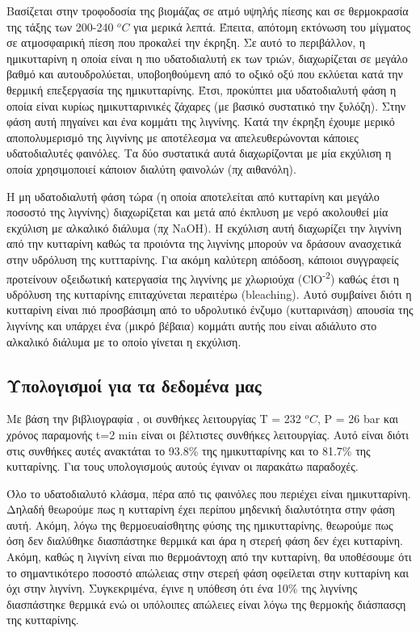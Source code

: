 \documentclass[11pt]{article}
\begin{document}
Βασίζεται στην τροφοδοσία της βιομάζας σε ατμό υψηλής πίεσης και σε θερμοκρασία της τάξης των 200-240 \(^oC\) για μερικά λεπτά. Έπειτα, απότομη εκτόνωση του μίγματος σε ατμοσφαιρική πίεση που προκαλεί την έκρηξη. Σε αυτό το περιβάλλον, η ημικυτταρίνη η οποία είναι η πιο υδατοδιαλυτή εκ των τριών, διαχωρίζεται σε μεγάλο βαθμό και αυτουδρολύεται, υποβοηθούμενη από το οξικό οξύ που εκλύεται κατά την θερμική επεξεργασία της ημικυτταρίνης. Έτσι, προκύπτει μια υδατοδιαλυτή φάση η οποία είναι κυρίως ημικυτταρινικές ζάχαρες (με βασικό συστατικό την ξυλόζη). Στην φάση αυτή πηγαίνει και ένα κομμάτι της λιγνίνης. Κατά την έκρηξη έχουμε μερικό αποπολυμερισμό της λιγνίνης με αποτέλεσμα να απελευθερώνονται κάποιες υδατοδιαλυτές φαινόλες. Τα δύο συστατικά αυτά διαχωρίζονται με μία εκχύλιση η οποία χρησιμοποιεί κάποιον διαλύτη φαινολών (πχ αιθανόλη).

Η μη υδατοδιαλυτή φάση τώρα (η οποία αποτελείται από κυτταρίνη και μεγάλο ποσοστό της λιγνίνης) διαχωρίζεται και μετά από έκπλυση με νερό ακολουθεί μία εκχύλιση με αλκαλικό διάλυμα (πχ NaOH). Η εκχύλιση αυτή διαχωρίζει την λιγνίνη από την κυτταρίνη καθώς τα προιόντα της λιγνίνης μπορούν να δράσουν ανασχετικά στην υδρόλυση της κυττταρίνης. Για ακόμη καλύτερη απόδοση, κάποιοι συγγραφείς \cite{fernandez-bolanosCharacterizationLigninObtained1999} προτείνουν οξειδωτική κατεργασία της λιγνίνης με χλωριούχα (ClO\textsuperscript{-2}) καθώς έτσι η υδρόλυση της κυτταρίνης επιταχύνεται περαιτέρω (bleaching). Αυτό συμβαίνει διότι η κυτταρίνη είναι πιό προσβάσιμη από το υδρολυτικό ένζυμο (κυτταρινάση) απουσία της λιγνίνης και υπάρχει ένα (μικρό βέβαια) κομμάτι αυτής που είναι αδιάλυτο στο αλκαλικό διάλυμα με το οποίο γίνεται η εκχύλιση.

\subsection{Υπολογισμοί για τα δεδομένα μας}
\label{sec:org2f80708}
Με βάση την βιβλιογραφία \cite{fernandez-bolanosSteamexplosionOliveStones2001}, οι συνθήκες λειτουργίας T = 232 \(^oC\), P = 26 bar και χρόνος παραμονής t=2 min είναι οι βέλτιστες συνθήκες λειτουργίας. Αυτό είναι διότι στις συνθήκες αυτές ανακτάται το 93.8\% της ημικυτταρίνης και το 81.7\% της κυτταρίνης. Για τους υπολογισμούς αυτούς έγιναν οι παρακάτω παραδοχές.

Όλο το υδατοδιαλυτό κλάσμα, πέρα από τις φαινόλες που περιέχει είναι ημικυτταρίνη. Δηλαδή θεωρούμε πως η κυτταρίνη έχει περίπου μηδενική διαλυτότητα στην φάση αυτή. Ακόμη, λόγω της θερμοευαίσθητης φύσης της ημικυτταρίνης, θεωρούμε πως όση δεν διαλύθηκε διασπάστηκε θερμικά και άρα η στερεή φάση δεν έχει κυτταρίνη. Ακόμη, καθώς η λιγνίνη είναι πιο θερμοάντοχη από την κυτταρίνη, θα υποθέσουμε ότι το σημαντικότερο ποσοστό απώλειας στην στερεή φάση οφείλεται στην κυτταρίνη και όχι στην λιγνίνη. Συγκεκριμένα, έγινε η υπόθεση ότι ένα 10\% της λιγνίνης διασπάστηκε θερμικά ενώ οι υπόλοιπες απώλειες είναι λόγω της θερμοκής διάσπασςη της κυτταρίνης.
\end{document}
